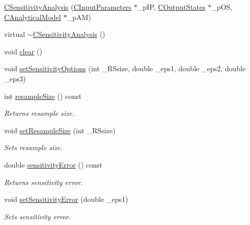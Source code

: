 \begin{DoxyCompactItemize}
\item 
\hyperlink{class_go_s_u_m_1_1_c_sensitivity_analysis_a4b038d1332020eabaf57306feec84568}{C\-Sensitivity\-Analysis} (\hyperlink{class_go_s_u_m_1_1_c_input_parameters}{C\-Input\-Parameters} $\ast$\-\_\-p\-I\-P, \hyperlink{class_go_s_u_m_1_1_c_output_states}{C\-Output\-States} $\ast$\-\_\-p\-O\-S, \hyperlink{class_go_s_u_m_1_1_c_analytical_model}{C\-Analytical\-Model} $\ast$\-\_\-p\-A\-M)
\item 
virtual \hyperlink{class_go_s_u_m_1_1_c_sensitivity_analysis_a95c029a4782c7894ea81dd87f552f486}{$\sim$\-C\-Sensitivity\-Analysis} ()
\item 
void \hyperlink{class_go_s_u_m_1_1_c_sensitivity_analysis_a735958f5e185dcd8cb52cbc96c03a30c}{clear} ()
\item 
void \hyperlink{class_go_s_u_m_1_1_c_sensitivity_analysis_af68023bdd1984843c5070c95a295c235}{set\-Sensitivity\-Options} (int \-\_\-\-R\-Ssize, double \-\_\-eps1, double \-\_\-eps2, double \-\_\-eps3)
\item 
int \hyperlink{class_go_s_u_m_1_1_c_sensitivity_analysis_a84d72c0e8db6d639f2e0742c88820f71}{resample\-Size} () const 
\begin{DoxyCompactList}\small\item\em Returns resample size. \end{DoxyCompactList}\item 
void \hyperlink{class_go_s_u_m_1_1_c_sensitivity_analysis_ab9cc0053b21b5fd50e1d9080fdabfe3b}{set\-Resample\-Size} (int \-\_\-\-R\-Ssize)
\begin{DoxyCompactList}\small\item\em Sets resample size. \end{DoxyCompactList}\item 
double \hyperlink{class_go_s_u_m_1_1_c_sensitivity_analysis_a52581eded17ee8409b5ae4d68d7ad6f3}{sensitivity\-Error} () const 
\begin{DoxyCompactList}\small\item\em Returns sensitivity error. \end{DoxyCompactList}\item 
void \hyperlink{class_go_s_u_m_1_1_c_sensitivity_analysis_a412a14d208245c607ef78f931805a852}{set\-Sensitivity\-Error} (double \-\_\-eps1)
\begin{DoxyCompactList}\small\item\em Sets sensitivity error. \end{DoxyCompactList}\item 

\end{DoxyCompactItemize}
